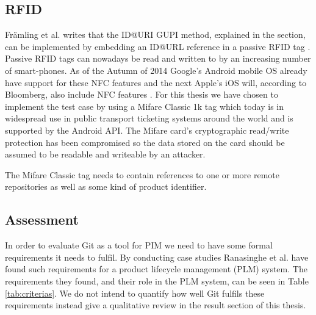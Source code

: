 \documentclass[12pt,a4paper]{article}
\begin{document}
\subsection{RFID}
Främling et al. writes that the ID@URI GUPI method, explained in the  section, can be implemented by embedding an ID@URL reference in a passive RFID tag \citep{gupi}. Passive RFID tags can nowadays be read and written to by an increasing number of smart-phones. As of the Autumn of 2014 Google's Android mobile OS already have support for these NFC features and the next Apple's iOS will, according to Bloomberg, also include NFC features \citep{apple}. For this thesis we have chosen to implement the test case by using a Mifare Classic 1k tag which today is in widespread use in public transport ticketing systems around the world and is supported by the Android API. The Mifare card's cryptographic read/write protection has been compromised \citep{micrack} so the data stored on the card should be assumed to be readable and writeable by an attacker.

The Mifare Classic tag needs to contain references to one or more remote repositories as well as some kind of product identifier.

\subsection{Assessment}
\label{assessment}
In order to evaluate Git as a tool for PIM we need to have some formal requirements it needs to fulfil. By conducting case studies Ranasinghe et al. \citep{plcm} have found such requirements for a product lifecycle management (PLM) system. The requirements they found, and their role in the PLM system, can be seen in Table \ref{tab:criterias}. We do not intend to quantify how well Git fulfils these requirements instead give a qualitative review in the result section of this thesis.

\end{document}
